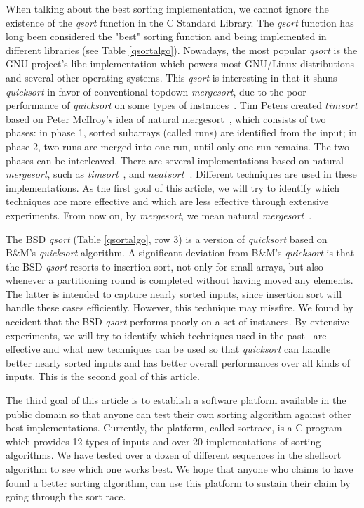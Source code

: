 \documentclass[AMA,STIX1COL]{WileyNJD-v2}
\newcommand{\qusort}{\emph{quicksort }}
\newcommand{\qsort}{\emph{qsort }}
\newcommand{\tsortn}{\emph{timsort}}
\newcommand{\msortn}{\emph{mergesort}}
\begin{document}
When talking about the best sorting implementation, we cannot ignore the existence of the \qsort function in the C Standard Library.
The \qsort function has long been considered the "best" sorting function and being implemented in different libraries (see Table \ref{qsortalgo}). 
Nowadays, the most popular \qsort is the GNU project’s libc implementation which powers most GNU/Linux distributions and several other operating systems. 
This \qsort is interesting in that it shuns \qusort in favor of conventional topdown \msortn, due to the poor performance of \qusort on some types of instances~\cite{gnumergesort}.  
Tim Peters created $timsort$ based on Peter McIlroy’s idea of natural mergesort~\cite{mcilroy1993optimistic}, which consists of two phases: in phase 1, sorted subarrays (called runs) are identified from the input; in phase 2, two runs are merged into one run, until only one run remains. 
The two phases can be interleaved. 
There are several implementations based on natural \msortn, such as \tsortn~\cite{timsort}, and $neatsort$~\cite{la2014neatsort}. 
Different techniques are used in these implementations. 
As the first goal of this article, we will try to identify which techniques are more effective and which are less effective through extensive experiments. 
From now on, by \msortn, we mean natural \msortn~\cite{mcilroy1993optimistic}.

The BSD \qsort (Table \ref{qsortalgo}, row 3) is a version of \qusort based on B\&M’s \qusort algorithm. 
A significant deviation from B\&M’s \qusort is that the BSD \qsort resorts to insertion sort, not only for small arrays, but also whenever a partitioning round is completed without having moved any elements. 
The latter is intended to capture nearly sorted inputs, since insertion sort will handle these cases efficiently. 
However, this technique may missfire. We found by accident that the BSD \qsort performs poorly on a set of instances. 
By extensive experiments, we will try to identify which techniques used in the past~\cite{sedgewick1978implementing} are effective and what new techniques can be used so that \qusort can handle better nearly sorted inputs and has better overall performances over all kinds of inputs. 
This is the second goal of this article.

The third goal of this article is to establish a software platform available in the public domain so that anyone can test their own sorting algorithm against other best implementations. 
Currently, the platform, called sortrace, is a C program which provides 12 types of inputs and over 20 implementations of sorting algorithms. 
We have tested over a dozen of different sequences in the shellsort algorithm to see which one works best. 
We hope that anyone who claims to have found a better sorting algorithm, can use this platform to sustain their claim by going through the sort race.  
\end{document}
